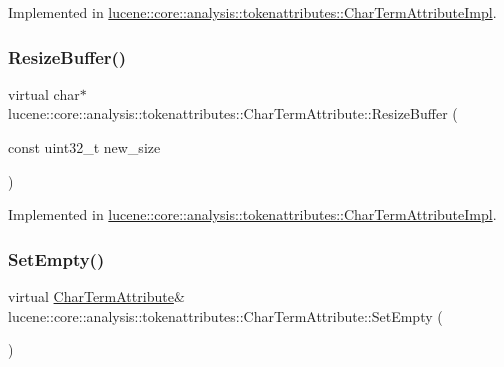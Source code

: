 Implemented in \mbox{\hyperlink{classlucene_1_1core_1_1analysis_1_1tokenattributes_1_1CharTermAttributeImpl_a65259a0e94791f009d7109f7bbd7d74e}{lucene\+::core\+::analysis\+::tokenattributes\+::\+Char\+Term\+Attribute\+Impl}}.

\mbox{\label{classlucene_1_1core_1_1analysis_1_1tokenattributes_1_1CharTermAttribute_ada68e9c9011b5ac61e9a34caf63aba6d}} 
\subsubsection{\texorpdfstring{Resize\+Buffer()}{ResizeBuffer()}}
{\footnotesize\ttfamily virtual char$\ast$ lucene\+::core\+::analysis\+::tokenattributes\+::\+Char\+Term\+Attribute\+::\+Resize\+Buffer (\begin{DoxyParamCaption}\item[{const uint32\+\_\+t}]{new\+\_\+size }\end{DoxyParamCaption})\hspace{0.3cm}{\ttfamily [pure virtual]}}



Implemented in \mbox{\hyperlink{classlucene_1_1core_1_1analysis_1_1tokenattributes_1_1CharTermAttributeImpl_abc195e8927e23632d34d4c081ede76b4}{lucene\+::core\+::analysis\+::tokenattributes\+::\+Char\+Term\+Attribute\+Impl}}.

\mbox{\label{classlucene_1_1core_1_1analysis_1_1tokenattributes_1_1CharTermAttribute_ac14e6e064418d1d56b0f33724dcfe8b0}} 
\subsubsection{\texorpdfstring{Set\+Empty()}{SetEmpty()}}
{\footnotesize\ttfamily virtual \mbox{\hyperlink{classlucene_1_1core_1_1analysis_1_1tokenattributes_1_1CharTermAttribute}{Char\+Term\+Attribute}}\& lucene\+::core\+::analysis\+::tokenattributes\+::\+Char\+Term\+Attribute\+::\+Set\+Empty (\begin{DoxyParamCaption}{ }\end{DoxyParamCaption})\hspace{0.3cm}{\ttfamily [pure virtual]}}



